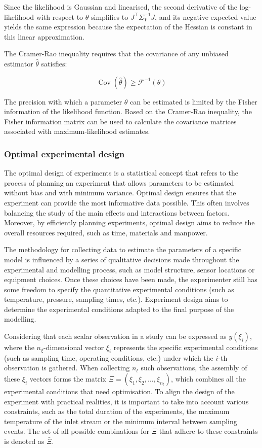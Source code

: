 \documentclass[a4paper,fleqn]{cas-dc}
\begin{document}
		Since the likelihood is Gaussian and linearised, the second derivative of the log-likelihood with respect to $\theta$ simplifies to $J^\top \Sigma_Y^{-1} J$, and its negative expected value yields the same expression because the expectation of the Hessian is constant in this linear approximation.
		
		The Cramer-Rao inequality requires that the covariance of any unbiased estimator $\hat{\theta}$ satisfies:
		
		{\footnotesize \begin{equation} \operatorname{Cov}(\hat{\theta}) \geq \mathcal{F}^{-1}(\theta) \end{equation} }
		
		The precision with which a parameter $\theta$ can be estimated is limited by the Fisher information of the likelihood function. Based on the Cramer-Rao inequality, the Fisher information matrix can be used to calculate the covariance matrices associated with maximum-likelihood estimates.
		
		\subsubsection{Optimal experimental design}
		
		The optimal design of experiments is a statistical concept that refers to the process of planning an experiment that allows parameters to be estimated without bias and with minimum variance. Optimal design ensures that the experiment can provide the most informative data possible. This often involves balancing the study of the main effects and interactions between factors. Moreover, by efficiently planning experiments, optimal design aims to reduce the overall resources required, such as time, materials and manpower.
		
		The methodology for collecting data to estimate the parameters of a specific model is influenced by a series of qualitative decisions made throughout the experimental and modelling process, such as model structure, sensor locations or equipment choices. Once these choices have been made, the experimenter still has some freedom to specify the quantitative experimental conditions (such as temperature, pressure, sampling times, etc.). Experiment design aims to determine the experimental conditions adapted to the final purpose of the modelling.
		
		Considering that each scalar observation in a study can be expressed as $y(\xi_i)$, where the $n_\xi$-dimensional vector $\xi_i$ represents the specific experimental conditions (such as sampling time, operating conditions, etc.) under which the $i$-th observation is gathered. When collecting $n_t$ such observations, the assembly of these $\xi_i$ vectors forms the matrix $\Xi = (\xi_1, \xi_2, \dots, \xi_{n_t})$, which combines all the experimental conditions that need optimisation. To align the design of the experiment with practical realities, it is important to take into account various constraints, such as the total duration of the experiments, the maximum temperature of the inlet stream or the minimum interval between sampling events. The set of all possible combinations for $\Xi$ that adhere to these constraints is denoted as $\bar{\Xi}$.
		
\end{document}
